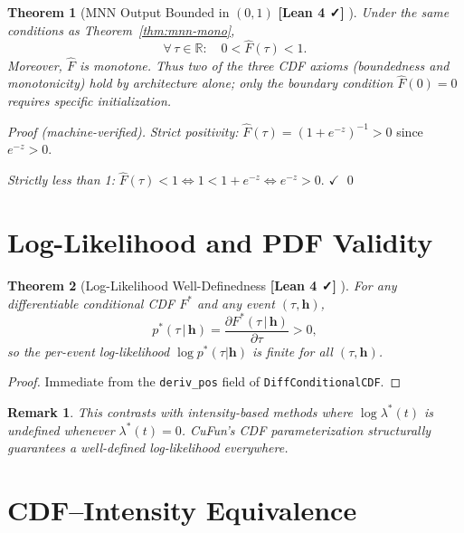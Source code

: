 \documentclass[11pt]{article}
\newtheorem{theorem}{Theorem}[section]
\newtheorem{remark}{Remark}
\newcommand{\verified}{%
  \textcolor{green!60!black}{\textbf{[Lean 4 ✓]}}%
}
\newcommand{\R}{\mathbb{R}}
\newcommand{\hhat}{\boldsymbol{h}}
\begin{document}
\begin{theorem}[MNN Output Bounded in $(0,1)$ \verified{}]
\label{thm:mnn-bounded}
Under the same conditions as Theorem~\ref{thm:mnn-mono},
\[
  \forall\, \tau \in \R: \quad 0 < \hat{F}(\tau) < 1.
\]
Moreover, $\hat{F}$ is monotone. Thus two of the three CDF axioms
(boundedness and monotonicity) hold by architecture alone; only the
boundary condition $\hat{F}(0) = 0$ requires specific initialization.
\end{theorem}

\begin{proof}[Proof (machine-verified)]
\emph{Strict positivity:} $\hat{F}(\tau) = (1 + e^{-z})^{-1} > 0$ since $e^{-z} > 0$.

\emph{Strictly less than 1:} $\hat{F}(\tau) < 1 \iff 1 < 1 + e^{-z} \iff e^{-z} > 0$. $\checkmark$ \qed
\end{proof}

\section{Log-Likelihood and PDF Validity}

\begin{theorem}[Log-Likelihood Well-Definedness \verified{}]
\label{thm:log-ll}
For any differentiable conditional CDF $F^*$ and any event $(\tau, \hhat)$,
\[
  p^*(\tau\,|\,\hhat) = \frac{\partial F^*(\tau\,|\,\hhat)}{\partial \tau} > 0,
\]
so the per-event log-likelihood $\log p^*(\tau|\hhat)$ is finite for all $(\tau, \hhat)$.
\end{theorem}

\begin{proof}
Immediate from the \texttt{deriv\_pos} field of \texttt{DiffConditionalCDF}.
\end{proof}

\begin{remark}
This contrasts with intensity-based methods where $\log\lambda^*(t)$ is undefined
whenever $\lambda^*(t) = 0$. CuFun's CDF parameterization structurally guarantees
a well-defined log-likelihood everywhere.
\end{remark}

\section{CDF–Intensity Equivalence}
\end{document}
